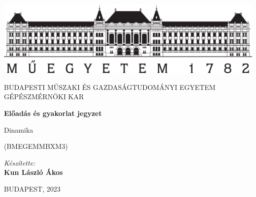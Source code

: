 \documentclass[12pt,a4paper]{article}
\begin{document}
\begin{titlepage}
\centering

\includegraphics[width=.8\textwidth]{bme_logo_nagy.jpg}

\vspace{1em}

{
\large
BUDAPESTI MŰSZAKI ÉS GAZDASÁGTUDOMÁNYI EGYETEM GÉPÉSZMÉRNÖKI KAR
}

\vspace{8em}

{
\Huge
\textbf{Előadás és gyakorlat jegyzet}
}

\vspace{10em}

{
\huge
Dinamika

\vspace{.2em}

\large
(BMEGEMMBXM3)
}

\vspace{4em}

{
\Large
\textit{Készítette:}\\
\vspace{.5em}
\textbf{Kun László Ákos}
}

\vspace{16em}

{
\large
BUDAPEST, 2023
}
\end{titlepage}






\end{document}
